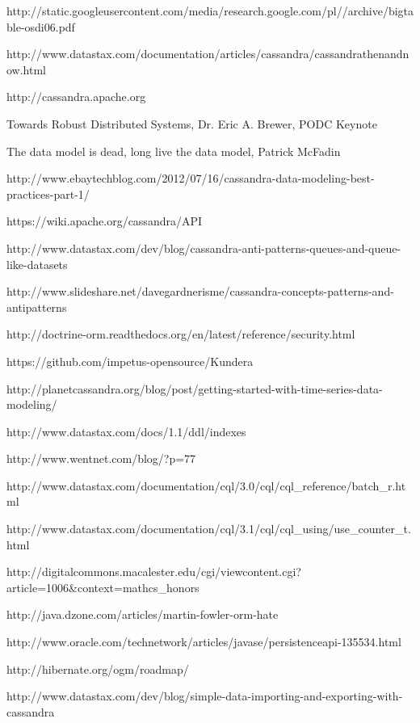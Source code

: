 \begin{thebibliography}{9}

http://static.googleusercontent.com/media/research.google.com/pl//archive/bigtable-osdi06.pdf

http://www.datastax.com/documentation/articles/cassandra/cassandrathenandnow.html

http://cassandra.apache.org

Towards Robust Distributed Systems, Dr. Eric A. Brewer, PODC Keynote

The data model is dead, long live the data model, Patrick McFadin

http://www.ebaytechblog.com/2012/07/16/cassandra-data-modeling-best-practices-part-1/

https://wiki.apache.org/cassandra/API

http://www.datastax.com/dev/blog/cassandra-anti-patterns-queues-and-queue-like-datasets

http://www.slideshare.net/davegardnerisme/cassandra-concepts-patterns-and-antipatterns

http://doctrine-orm.readthedocs.org/en/latest/reference/security.html

https://github.com/impetus-opensource/Kundera

http://planetcassandra.org/blog/post/getting-started-with-time-series-data-modeling/

http://www.datastax.com/docs/1.1/ddl/indexes

http://www.wentnet.com/blog/?p=77

http://www.datastax.com/documentation/cql/3.0/cql/cql\_reference/batch\_r.html

http://www.datastax.com/documentation/cql/3.1/cql/cql\_using/use\_counter\_t.html

http://digitalcommons.macalester.edu/cgi/viewcontent.cgi?article=1006\&context=mathcs\_honors

http://java.dzone.com/articles/martin-fowler-orm-hate

http://www.oracle.com/technetwork/articles/javase/persistenceapi-135534.html

http://hibernate.org/ogm/roadmap/

http://www.datastax.com/dev/blog/simple-data-importing-and-exporting-with-cassandra

\end{thebibliography}